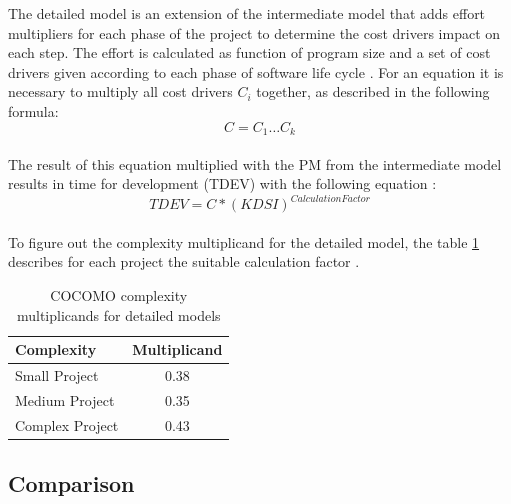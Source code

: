 The detailed model is an extension of the intermediate model that adds effort multipliers for each phase of the project to determine the cost drivers impact on each step. The effort is calculated as function of program size and a set of cost drivers given according to each phase of software life cycle \cite{boehm}. For an equation it is necessary to multiply all cost drivers \textbf{\(C_i\)} together, as described in the following formula:\\
\begin{equation}
C = C_1 \dots C_k \label{cocomo:detailedcostdrivers}
\end{equation}\\
The result of this equation multiplied with the PM from the intermediate model results in time for development (TDEV) with the following equation \cite{boehm}:\\
\begin{equation}
TDEV = C * (KDSI)^{Calculation Factor} \label{cocomo:detailed}
\end{equation}\\
To figure out the complexity multiplicand for the detailed model, the table \ref{cocomo:detailedComplexity} describes for each project the suitable calculation factor \cite{boehm}.\\
\begin{table}[h]
	\centering 
	\setlength{\tabcolsep}{4pt}
	\begin{tabular}{|l||c|}\hline
		Complexity	& Multiplicand\\ \hline\hline
		Small Project   	& 0.38        		\\ \hline
		Medium Project 		& 0.35        		\\ \hline
		Complex Project 	& 0.43 			\\ \hline
	\end{tabular} 
	\caption{COCOMO complexity multiplicands for detailed models} 
	\label{cocomo:detailedComplexity} 
\end{table}
\subsection{Comparison}

